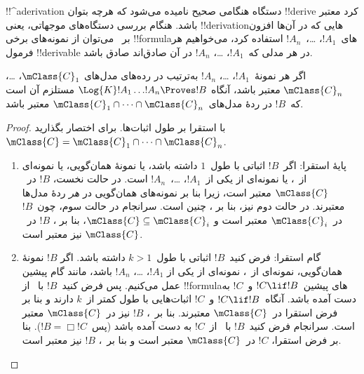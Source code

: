 \documentclass[../../../include/open-logic-section]{subfiles}
\begin{document}


!!^a{derivation} دستگاه هنگامی صحیح نامیده می‌شود که هرچه بتوان
!!{derive} کرد معتبر باشد. هنگام بررسی دستگاه‌های موجهاتی، یعنی
!!{derivation}هایی که در آن‌ها افزون بر~ می‌توان از نمونه‌های
برخی !!{formula}های~$!A_1$، \dots،~$!A_n$ استفاده کرد، می‌خواهیم هر
فرمول !!{derivable} در هر مدلی که~$!A_1$، \dots، $!A_n$ در آن صادق‌اند
صادق باشد.

\begin{thm}
  اگر هر نمونهٔ~$!A_1$، \dots، $!A_n$ به‌ترتیب در رده‌های مدل‌های
  $\mClass{C}_1$، \dots، $\mClass{C}_n$ معتبر باشد، آنگاه
  $\Log{K}!A_1\dots !A_n \Proves !B$ مستلزم آن است که~$!B$ در ردهٔ
  مدل‌های~$\mClass{C}_1 \cap \dots \cap \mClass{C}_n$ معتبر باشد.
\end{thm}

\begin{proof}
  با استقرا بر طول اثبات‌ها. برای اختصار بگذارید
  $\mClass{C} = \mClass{C}_1 \cap \dots \cap \mClass{C}_n$.
  \begin{enumerate}
  \item پایهٔ استقرا: اگر~$!B$ اثباتی با طول~$1$ داشته باشد، یا نمونهٔ
    همان‌گویی، یا نمونه‌ای از~،
    یا نمونه‌ای از یکی از~$!A_1$، \dots،~$!A_n$ است. در حالت نخست،
    $!B$ در~$\mClass{C}$ معتبر است، زیرا بنا بر
     نمونه‌های همان‌گویی در \emph{هر}
    ردهٔ مدل‌ها معتبرند. در حالت دوم نیز، بنا بر
    ، چنین است. سرانجام در حالت
    سوم، چون~$!B$ در~$\mClass{C}_i$ معتبر است و
    $\mClass{C} \subseteq \mClass{C}_i$، بنا بر
    ، $!B$ در~$\mClass{C}$ نیز معتبر
    است.
  \item گام استقرا: فرض کنید~$!B$ اثباتی با طول~$k>1$ داشته باشد. اگر
    $!B$ نمونهٔ همان‌گویی، نمونه‌ای از~،
     نمونه‌ای از یکی از
    $!A_1$، \dots، $!A_n$ باشد، مانند گام پیشین عمل می‌کنیم. پس فرض
    کنید~$!B$ با~\MP{} از !!{formula}های پیشین~$!C \lif !B$ و~$!C$
    به دست آمده باشد. آنگاه~$!C \lif !B$ و~$!C$ اثبات‌هایی با طول
    کمتر از~$k$ دارند و بنا بر فرض استقرا در~$\mClass{C}$ معتبرند. بنا
    بر~، $!B$ نیز در~$\mClass{C}$ معتبر
    است. سرانجام فرض کنید~$!B$ با~\Nec{} از~$!C$ به دست آمده باشد
    (پس~$!B = \Box!C$). بنا بر فرض استقرا، $!C$ در~$\mClass{C}$ معتبر
    است و بنا بر~، $!B$ نیز معتبر است.
  \end{enumerate}
\end{proof}
\end{document}
